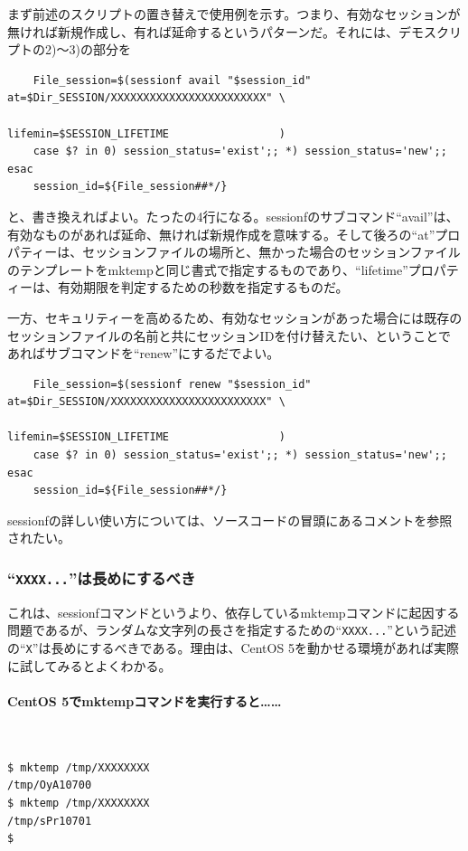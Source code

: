 まず前述のスクリプトの置き替えで使用例を示す。つまり、有効なセッションが無ければ新規作成し、有れば延命するというパターンだ。それには、デモスクリプトの2)～3)の部分を \\
\begin{frameboxit}{160.0mm}
\begin{verbatim}
	File_session=$(sessionf avail "$session_id" at=$Dir_SESSION/XXXXXXXXXXXXXXXXXXXXXXXX" \
	                                            lifemin=$SESSION_LIFETIME                 )
	case $? in 0) session_status='exist';; *) session_status='new';; esac
	session_id=${File_session##*/}
\end{verbatim}
\end{frameboxit}
と、書き換えればよい。たったの4行になる。sessionfのサブコマンド``avail''は、有効なものがあれば延命、無ければ新規作成を意味する。そして後ろの``at''プロパティーは、セッションファイルの場所と、無かった場合のセッションファイルのテンプレートをmktempと同じ書式で指定するものであり、``lifetime''プロパティーは、有効期限を判定するための秒数を指定するものだ。

一方、セキュリティーを高めるため、有効なセッションがあった場合には既存のセッションファイルの名前と共にセッションIDを付け替えたい、ということであればサブコマンドを``renew''にするだでよい。\\
\begin{frameboxit}{160.0mm}
\begin{verbatim}
	File_session=$(sessionf renew "$session_id" at=$Dir_SESSION/XXXXXXXXXXXXXXXXXXXXXXXX" \
	                                            lifemin=$SESSION_LIFETIME                 )
	case $? in 0) session_status='exist';; *) session_status='new';; esac
	session_id=${File_session##*/}
\end{verbatim}
\end{frameboxit}

sessionfの詳しい使い方については、ソースコードの冒頭にあるコメントを参照されたい。

\subsubsection*{``\verb|XXXX...|''は長めにするべき}

これは、sessionfコマンドというより、依存しているmktempコマンドに起因する問題であるが、ランダムな文字列の長さを指定するための``\verb|XXXX...|''という記述の``\verb|X|''は長めにするべきである。理由は、CentOS 5を動かせる環境があれば実際に試してみるとよくわかる。

\paragraph{CentOS 5でmktempコマンドを実行すると……} 　\\
\begin{screen}
	\verb|$ mktemp /tmp/XXXXXXXX| \return \\
	\verb|/tmp/OyA10700|                  \\
	\verb|$ mktemp /tmp/XXXXXXXX| \return \\
	\verb|/tmp/sPr10701|                  \\
	\verb|$ |
\end{screen}

